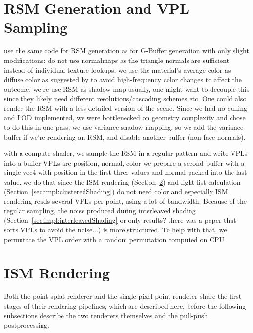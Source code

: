 \section{RSM Generation and VPL Sampling}
\label{sec:impl:rsmAndVplSampling}
\begin{outline}
\1 use the same code for RSM generation as for G-Buffer generation with only slight modifications:
\1 do not use normalmaps as the triangle normals are sufficient
\1 instead of individual texture lookups, we use the material's average color as diffuse color as suggested by \citet{hedman2016sequential} to avoid high-frequency color changes to affect the outcome.
\1 we re-use RSM as shadow map
    \2 usually, one might want to decouple this since they likely need different resolutions/cascading schemes etc. One could also render the RSM with a less detailed version of the scene. Since we had no culling and LOD implemented, we were bottlenecked on geometry complexity and chose to do this in one pass.
    \2 we use variance shadow mapping. so we add the variance buffer if we're rendering an RSM, and disable another buffer (non-face normals).

\1 with a compute shader, we sample the RSM in a regular pattern and write VPLs into a buffer
\1 VPLs are position, normal, color
\1 we prepare a second buffer with a single vec4 with position in the first three values and normal packed into the last value.
\1 we do that since the ISM rendering (Section~\ref{sec:impl:ismRendering}) and light list calculation (Section~\ref{sec:impl:clusteredShading}) do not need color and especially ISM rendering reads several VPLs per point, using a lot of bandwidth.
\1 Because of the regular sampling, the noise produced during interleaved shading (Section~\ref{sec:impl:interleavedShading} or only results? there was a paper that sorts VPLs to avoid the noise...) is more structured. To help with that, we permutate the VPL order with a random permutation computed on CPU
\end{outline}


\section{ISM Rendering}
\label{sec:impl:ismRendering}

Both the point splat renderer and the single-pixel point renderer share the first stages of their rendering pipelines, which are described here, before the following subsections describe the two renderers themselves and the pull-push postprocessing.

